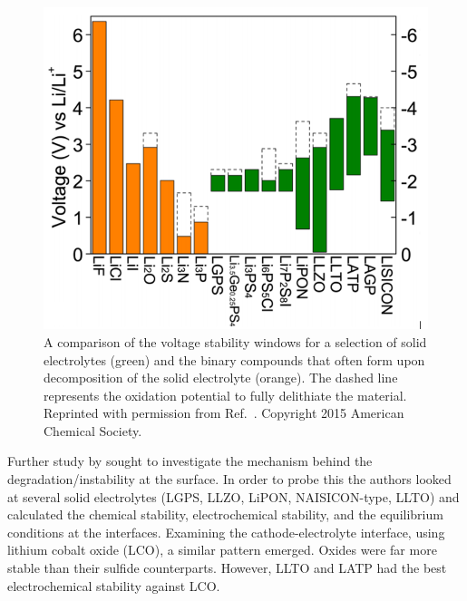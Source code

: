 \documentclass[../main.tex]{subfiles}
\begin{document}
\begin{figure}[H]
    \centering
    \includegraphics[scale=0.45]{figures/SE_voltage_stability.png}
    \caption{A comparison of the voltage stability windows for a selection of solid electrolytes (green) and the binary compounds that often form upon decomposition of the solid electrolyte (orange). The dashed line represents the oxidation potential to fully delithiate the material. Reprinted with permission from Ref.~. Copyright 2015 American Chemical Society.}
    \label{fig:se_stab}
\end{figure}

Further study by \citeauthor{Zhu2016} sought to investigate the mechanism behind the degradation/instability at the surface.\cite{Zhu2016} In order to probe this the authors looked at several solid electrolytes (LGPS, LLZO, LiPON, NAISICON-type, LLTO) and calculated the chemical stability, electrochemical stability, and the equilibrium conditions at the interfaces. Examining the cathode-electrolyte interface, using lithium cobalt oxide (LCO), a similar pattern emerged. Oxides were far more stable than their sulfide counterparts. However, LLTO and LATP had the best electrochemical stability against LCO.
\end{document}
